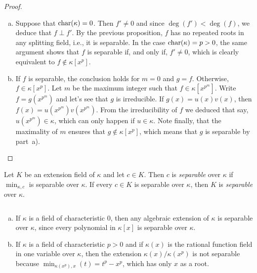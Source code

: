 \begin{proof}${}$
    \begin{enumerate}[a), font=\upshape]
        \item Suppose that $\operatorname{char}(\kappa)=0$. Then $f'\ne0$ and since $\deg(f')<\deg(f)$, we deduce that $f\perp f'$. By the previous proposition, $f$ has no repeated roots in any splitting field, i.e., it is separable. In the case $\operatorname{char}(\kappa)=p>0$, the same argument shows that $f$ is separable if, and only if, $f'\ne0$, which is clearly equivalent to $f\notin\kappa[x^p]$.

        \item If $f$ is separable, the conclusion holds for $m=0$ and $g=f$. Otherwise, $f\in\kappa[x^p]$. Let $m$ be the maximum integer such that $f\in\kappa[x^{p^m}]$. Write $f=g(x^{p^m})$ and let's see that $g$ is irreducible. If $g(x)=u(x)v(x)$, then $f(x)=u(x^{p^m})v(x^{p^m})$. From the irreducibility of $f$ we deduced that say, $u(x^{p^m})\in\kappa$, which can only happen if $u\in\kappa$. Note finally, that the maximality of $m$ ensures that $g\notin\kappa[x^p]$, which means that $g$ is separable by part~a).
    \end{enumerate}
\end{proof}

\begin{defn}
    Let\/ $K$ be an extension field of\/ $\kappa$ and let\/ $c \in K$. Then\/ $c$ is \textsl{separable} over\/ $\kappa$ if\/ $\min_{\kappa,c}$ is separable over\/ $\kappa$. If every\/ $c \in K$ is separable over\/ $\kappa$, then\/ $K$ is \textsl{separable} over\/ $\kappa$.
\end{defn}

\begin{xmpls}${}$
    \begin{enumerate}[a), font=\upshape]
        \item If $\kappa$ is a field of characteristic 0, then any algebraic extension of $\kappa$ is separable over $\kappa$, since every polynomial in $\kappa[x]$ is separable over $\kappa$.

        \item If $\kappa$ is a field of characteristic $p > 0$ and if $\kappa(x)$ is the rational function field in one variable over $\kappa$, then the extension $\kappa(x)/\kappa(x^p)$ is not separable because $\min_{\kappa(x^p), x}(t) = t^p - x^p$, which has only $x$ as a root.
    \end{enumerate}
\end{xmpls}

